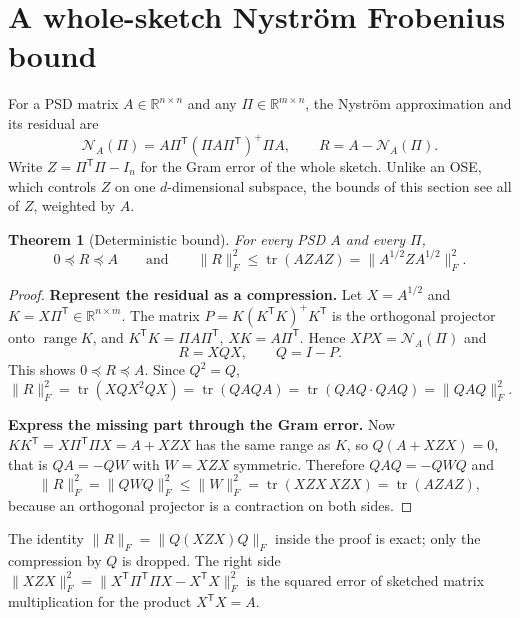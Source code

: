 \documentclass[11pt,a4paper]{article}
\newtheorem{theorem}{Theorem}[section]
\theoremstyle{definition}
\theoremstyle{remark}
\newcommand{\R}{\mathbb R}
\newcommand{\tr}{\operatorname{tr}}
\newcommand{\range}{\operatorname{range}}
\newcommand{\norm}[1]{\lVert#1\rVert}
\newcommand{\Nys}{\mathcal N}
\newcommand{\1}{\mathbf 1}
\newcommand{\T}{\mathsf T}
\newcommand{\proofstep}[1]{\par\medskip\noindent\textbf{#1}\enspace}
\begin{document}
\section{A whole-sketch Nystr\"om Frobenius bound}\label{sec:nystrom}

For a PSD matrix $A\in\R^{n\times n}$ and any $\Pi\in\R^{m\times n}$,
the Nystr\"om approximation and its residual are
\[
 \Nys_A(\Pi)=A\Pi^\T(\Pi A\Pi^\T)^+\Pi A,\qquad R=A-\Nys_A(\Pi).
\]
Write $Z=\Pi^\T\Pi-I_n$ for the Gram error of the whole sketch. Unlike an
OSE, which controls $Z$ on one $d$-dimensional subspace, the bounds of
this section see all of $Z$, weighted by $A$.

\begin{theorem}[Deterministic bound]\label{thm:det}
For every PSD $A$ and every $\Pi$,
\[
 0\preceq R\preceq A\qquad\text{and}\qquad
 \norm R_F^2\le\tr(AZAZ)=\norm{A^{1/2}ZA^{1/2}}_F^2 .
\]
\end{theorem}
\begin{proof}
\proofstep{Represent the residual as a compression.}
Let $X=A^{1/2}$ and $K=X\Pi^\T\in\R^{n\times m}$. The matrix
$P=K(K^\T K)^+K^\T$ is the orthogonal projector onto $\range K$, and
$K^\T K=\Pi A\Pi^\T$, $XK=A\Pi^\T$. Hence $XPX=\Nys_A(\Pi)$ and
\[
 R=XQX,\qquad Q=I-P .
\]
This shows $0\preceq R\preceq A$. Since $Q^2=Q$,
\[
 \norm R_F^2=\tr(XQX^2QX)=\tr(QAQA)=\tr(QAQ\cdot QAQ)=\norm{QAQ}_F^2 .
\]
\proofstep{Express the missing part through the Gram error.}
Now $KK^\T=X\Pi^\T\Pi X=A+XZX$ has the same range as $K$, so
$Q(A+XZX)=0$, that is $QA=-QW$ with $W=XZX$ symmetric. Therefore
$QAQ=-QWQ$ and
\[
 \norm R_F^2=\norm{QWQ}_F^2\le\norm W_F^2=\tr(XZX\,XZX)=\tr(AZAZ),
\]
because an orthogonal projector is a contraction on both sides.
\end{proof}

The identity $\norm R_F=\norm{Q(XZX)Q}_F$ inside the proof is exact;
only the compression by $Q$ is dropped. The right side
$\norm{XZX}_F^2=\norm{X^\T\Pi^\T\Pi X-X^\T X}_F^2$ is the squared error of
sketched matrix multiplication for the product $X^\T X=A$.
\end{document}

